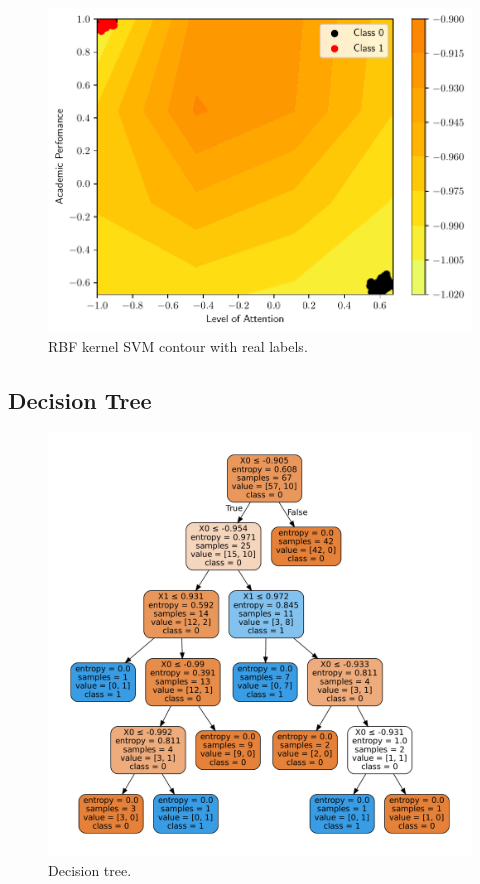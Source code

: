 \documentclass[conference]{IEEEtran}
\theoremstyle{definition}
\theoremstyle{remark}
\theoremstyle{remark}
\begin{document}
\begin{figure}
  \includegraphics[width=\columnwidth]{figs/svm-emb-rbf-contour-0-1.pdf}
  \caption{RBF kernel SVM contour with real labels.}
\end{figure}

\subsection{Decision Tree}
\begin{figure}
    \includegraphics[width=\columnwidth]{figs/tree-emb-graph.pdf}
    \caption{Decision tree.}
\end{figure}
\end{document}
